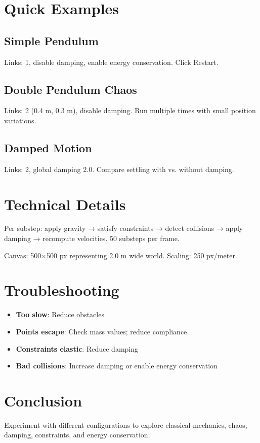\documentclass[12pt,a4paper]{article}
\begin{document}
\section{Quick Examples}

\subsection{Simple Pendulum}

Links: 1, disable damping, enable energy conservation. Click Restart.

\subsection{Double Pendulum Chaos}

Links: 2 (0.4 m, 0.3 m), disable damping. Run multiple times with small position variations.

\subsection{Damped Motion}

Links: 2, global damping 2.0. Compare settling with vs. without damping.

\section{Technical Details}

Per substep: apply gravity → satisfy constraints → detect collisions → apply damping → recompute velocities. 50 substeps per frame.

Canvas: 500$\times$500 px representing 2.0 m wide world. Scaling: 250 px/meter.

\section{Troubleshooting}

\begin{itemize}
\item \textbf{Too slow}: Reduce obstacles
\item \textbf{Points escape}: Check mass values; reduce compliance
\item \textbf{Constraints elastic}: Reduce damping
\item \textbf{Bad collisions}: Increase damping or enable energy conservation
\end{itemize}

\section{Conclusion}

Experiment with different configurations to explore classical mechanics, chaos, damping, constraints, and energy conservation.
\end{document}
